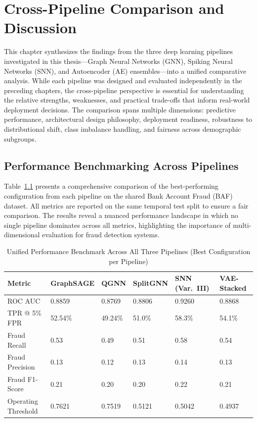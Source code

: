\chapter{Cross-Pipeline Comparison and Discussion}
\label{ch:comparison}

This chapter synthesizes the findings from the three deep learning pipelines investigated in this thesis---Graph Neural Networks (GNN), Spiking Neural Networks (SNN), and Autoencoder (AE) ensembles---into a unified comparative analysis. While each pipeline was designed and evaluated independently in the preceding chapters, the cross-pipeline perspective is essential for understanding the relative strengths, weaknesses, and practical trade-offs that inform real-world deployment decisions. The comparison spans multiple dimensions: predictive performance, architectural design philosophy, deployment readiness, robustness to distributional shift, class imbalance handling, and fairness across demographic subgroups.

\section{Performance Benchmarking Across Pipelines}

Table~\ref{tab:ch8-pipeline-benchmark} presents a comprehensive comparison of the best-performing configuration from each pipeline on the shared Bank Account Fraud (BAF) dataset. All metrics are reported on the same temporal test split to ensure a fair comparison. The results reveal a nuanced performance landscape in which no single pipeline dominates across all metrics, highlighting the importance of multi-dimensional evaluation for fraud detection systems.

\begin{table}[H]
\centering
\caption{Unified Performance Benchmark Across All Three Pipelines (Best Configuration per Pipeline)}
\label{tab:ch8-pipeline-benchmark}
\small
\setlength{\tabcolsep}{6pt}
\begin{tabularx}{\textwidth}{>{\RaggedRight\arraybackslash}p{3.8cm} X X X X X}
\toprule
\textbf{Metric} & \textbf{Graph\newline SAGE} & \textbf{QGNN} & \textbf{Split\newline GNN} & \textbf{SNN (Var.\ III)} & \textbf{VAE-Stacked} \\
\midrule
ROC AUC & 0.8859 & 0.8769 & 0.8806 & 0.9260 & 0.8868 \\
TPR @ 5\% FPR & 52.54\% & 49.24\% & 51.0\% & 58.3\% & 54.1\% \\
Fraud Recall & 0.53 & 0.49 & 0.51 & 0.58 & 0.54 \\
Fraud Precision & 0.13 & 0.12 & 0.13 & 0.14 & 0.13 \\
Fraud F1-Score & 0.21 & 0.20 & 0.20 & 0.22 & 0.21 \\
Operating Threshold & 0.7621 & 0.7519 & 0.5121 & 0.5042 & 0.4937 \\
\bottomrule
\end{tabularx}
\end{table}

